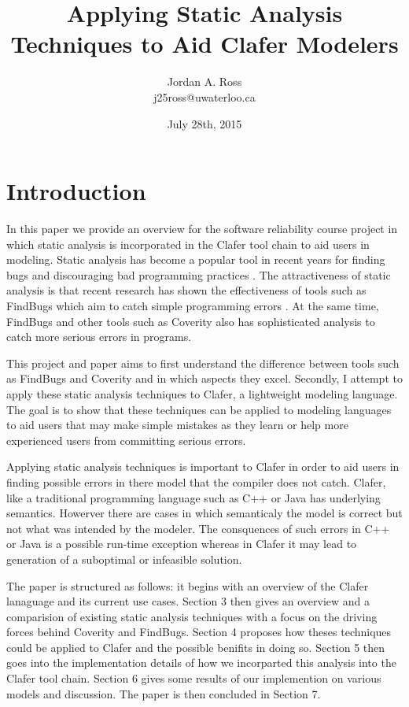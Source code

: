 \documentclass[10pt,oneside]{IEEEtran}
\title{Applying Static Analysis Techniques to Aid Clafer Modelers}
\author{Jordan A. Ross \\j25ross@uwaterloo.ca}
\date{July 28th, 2015}
\begin{document}
\maketitle
\newpage

\section{Introduction}
In this paper we provide an overview for the software reliability course project in which static analysis
is incorporated in the Clafer tool chain to aid users in modeling. Static analysis has become a popular
tool in recent years for finding bugs and discouraging bad programming practices \cite{8}.
The attractiveness of static analysis is that recent research has shown the effectiveness of tools
such as FindBugs which aim to catch simple programming errors \cite{6}. At the same time, FindBugs
and other tools such as Coverity also has sophisticated analysis to catch more serious errors in programs.

This project and paper aims to first understand the difference between tools such as FindBugs and Coverity
and in which aspects they excel. Secondly, I attempt to apply these static analysis techniques to Clafer, a
lightweight modeling language. The goal is to show that these techniques can be applied to modeling languages
to aid users that may make simple mistakes as they learn or help more experienced users from committing serious
errors.

Applying static analysis techniques is important to Clafer in order to aid users in finding possible errors in there model that the compiler does not catch. Clafer, like a traditional programming language such as C++ or Java has underlying semantics. Howerver there are cases in which semanticaly the model is correct but not what was intended by the modeler. The consquences of such errors in C++ or Java is a possible run-time exception whereas in Clafer it may lead to generation of a suboptimal or infeasible solution.

The paper is structured as follows: it begins with an overview of the Clafer lanaguage and its current use
cases. Section 3 then gives an overview and a comparision of existing static analysis techniques with a focus
on the driving forces behind Coverity and FindBugs. Section 4 proposes how theses techniques could be applied
to Clafer and the possible benifits in doing so. Section 5 then goes into the implementation details of how
we incorparted this analysis into the Clafer tool chain. Section 6 gives some results of our implemention on
various models and discussion. The paper is then concluded in Section 7.
\end{document}

